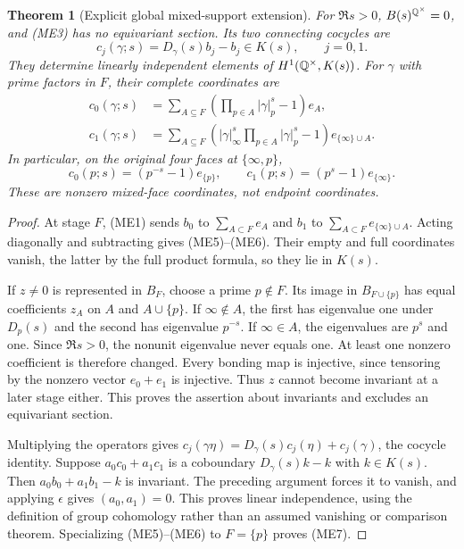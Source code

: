 \documentclass[11pt,a4paper]{article}
\newtheorem{theorem}{Theorem}[section]
\theoremstyle{definition}\newtheorem{definition}[theorem]{Definition}
\begin{document}
\begin{theorem}[Explicit global mixed-support extension]
\label{thm:ME-extension}
For $\Re s>0$, $B(s)^{\mathbb Q^\times}=0$, and (ME3) has no equivariant
section. Its two connecting cocycles are
\[
 c_j(\gamma;s)=D_\gamma(s)b_j-b_j\in K(s),\qquad j=0,1.
 \tag{ME4}
\]
They determine linearly independent elements of
$H^1(\mathbb Q^\times,K(s))$. For $\gamma$ with prime factors in $F$, their
complete coordinates are
\begin{align}
 c_0(\gamma;s)&=
 \sum_{A\subseteq F}
 \left(\prod_{p\in A}|\gamma|_p^s-1\right)e_A,\tag{ME5}\\
 c_1(\gamma;s)&=
 \sum_{A\subseteq F}
 \left(|\gamma|_\infty^s\prod_{p\in A}|\gamma|_p^s-1\right)
 e_{\{\infty\}\cup A}.\tag{ME6}
\end{align}
In particular, on the original four faces at $\{\infty,p\}$,
\[
 c_0(p;s)=(p^{-s}-1)e_{\{p\}},\qquad
 c_1(p;s)=(p^s-1)e_{\{\infty\}}.
 \tag{ME7}\label{eq:ME-local-cocycle}
\]
These are nonzero mixed-face coordinates, not endpoint coordinates.
\end{theorem}
\begin{proof}
At stage $F$, (ME1) sends $b_0$ to $\sum_{A\subset F}e_A$ and
$b_1$ to $\sum_{A\subset F}e_{\{\infty\}\cup A}$. Acting diagonally
and subtracting gives (ME5)--(ME6). Their empty and full coordinates vanish,
the latter by the full product formula, so they lie in $K(s)$.

If $z\ne0$ is represented in $B_F$, choose a prime $p\notin F$.
Its image in $B_{F\cup\{p\}}$ has equal coefficients $z_A$ on $A$
and $A\cup\{p\}$. If $\infty\notin A$, the first has eigenvalue one
under $D_p(s)$ and the second has eigenvalue $p^{-s}$. If
$\infty\in A$, the eigenvalues are $p^s$ and one. Since $\Re s>0$,
the nonunit eigenvalue never equals one. At least one nonzero coefficient
is therefore changed. Every bonding map is injective, since tensoring by
the nonzero vector $e_0+e_1$ is injective. Thus $z$ cannot become invariant
at a later stage either. This proves the assertion about invariants and
excludes an equivariant section.

Multiplying the operators gives
$c_j(\gamma\eta)=D_\gamma(s)c_j(\eta)+c_j(\gamma)$, the cocycle
identity. Suppose $a_0c_0+a_1c_1$ is a coboundary
$D_\gamma(s)k-k$ with $k\in K(s)$. Then
$a_0b_0+a_1b_1-k$ is invariant. The preceding argument forces it to
vanish, and applying $\epsilon$ gives $(a_0,a_1)=0$.
This proves linear independence, using the definition of group
cohomology rather than an assumed vanishing or comparison theorem.
Specializing (ME5)--(ME6) to $F=\{p\}$ proves (ME7).
\end{proof}
\end{document}
